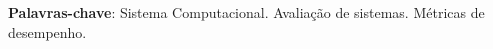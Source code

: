 \setlength{\absparsep}{18pt} %
\begin{resumo}


 \textbf{Palavras-chave}: Sistema Computacional. Avaliação de sistemas. Métricas de desempenho.

\end{resumo}


	




